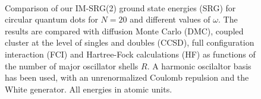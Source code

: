 \begin{figure}
  \centering
    \\
   
  \caption{Comparison of our IM-SRG(2) ground state energies (SRG)
    for circular quantum dots for $N=20$ and different values of
    $\omega$. The results are compared with diffusion Monte
    Carlo (DMC), coupled cluster at the level of singles and doubles
    (CCSD), full configuration interaction (FCI) and Hartree-Fock
    calculations (HF) as functions of the number of major oscillator
    shells $R$. A harmonic oscilaltor basis has been used, with an
    unrenormalized Coulomb repulsion and the White generator. All
    energies in atomic units.}
  \label{fig:N20}
\end{figure}

